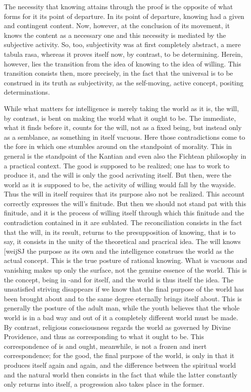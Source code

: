 The necessity that knowing attains through the proof is the opposite of
what forms for it its point of departure.
In its point of departure, knowing had a given and contingent content.
Now, however, at the conclusion of its movement,
it knows the content as a necessary one and
this necessity is mediated by the subjective activity.
So, too, subjectivity was at first completely abstract, a mere tabula rasa,
whereas it proves itself now, by contrast, to be determining.
Herein, however, lies the transition
from the idea of knowing to the idea of willing.
This transition consists then, more precisely, in the fact that
the universal is to be construed in its truth as subjectivity,
as the self-moving, active concept, positing determinations.

While what matters for intelligence is merely taking the world as it is,
the will, by contrast, is bent on making the world what it ought to be.
The immediate, what it finds before it, counts for the will, not as a fixed being,
but instead only as a semblance, as something in itself vacuous.
Here those contradictions come to the fore in which one stumbles around on the standpoint
of morality. This in general is the standpoint of the Kantian and even also the
Fichtean philosophy in a practical context. The good is supposed
to be realized; one has to work to produce it, and the will is only the good
acrivating itself. But then, were the world as it is supposed to be, the activity
of willing would fall by the wayside. Thus the will in itself requires that its
purpose also not be realized. This account correctly expresses the will's finitude.
But then we should not stand pat with this finitude, and it is the process of
willing itself through which this finitude and the contradiction contained in it
are sublated. The reconciliation consists in the fact that the will, in its result,
returns to the presupposition of knowing, that is to say, it consists in the unity of
the theoretical and pracrical idea. The will knows [weijSJ the purpose as its own
and the intelligence construes the world as the actual concept. This is the true
posture of rational knowing. What is vacuous and vanishing makes up only the
surface, not the genuine essence of the world. This is the concept, being in -and
for itself, and the world is thus itself the idea. The unsatisfied striving disappears
if we know that the final purpose of the world has been brought about and to the
same degree eternally brings itself about. This is generally the posture of the adult
man, while the youth believes that the whole world is in a bad way and out of it
a completely different world must be made. By contrast, religious consciousness
regards the world as governed by Divine Providence, and thus as corresponding
to what it ought to be. This correspondence of is and ought, meanwhile, is not
a frozen and inert correspondence; for the good, the final purpose of the world,
is only in that it produces itself again and again, and the difference between
the spiritual world and the natural world then consists in the fact that while
the latter constantly only returns into itself, a progression also takes place in the
former.

